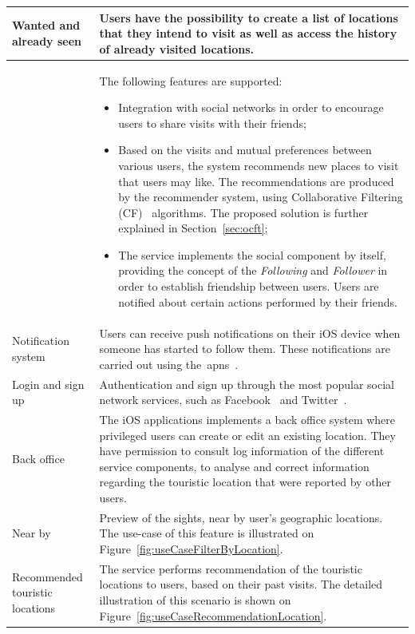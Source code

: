 \begin{center}
\begin{longtable}{ | p{3.5cm} | p{11.1cm} |}
    \specialcell[t]{Wanted and\\already seen} &
	Users have the possibility to create a list of locations that they intend to visit as well as access the history of already visited locations. \\ 
    \hline

	\specialcell[t]{Social component} &
    	The following features are supported:
	\begin{itemize}
	\item Integration with social networks in order to encourage users to share visits with their friends;
	\item Based on the visits and mutual preferences between various users, the system recommends new places to visit that users may like. The recommendations are produced by the recommender system, using Collaborative Filtering (CF)~\cite{ibCollabrativeVSGK}\cite{AmazonRecommendGLBSJY}\cite{recommSystemPMVS} algorithms. The proposed solution is further explained in Section~\ref{sec:ocft};
	\item The service implements the social component by itself, providing the concept of the \emph{Following} and \emph{Follower} in order to establish friendship between users. Users are notified about certain actions performed by their friends.
	\end{itemize}
    \\ 
    \hline
    
    Notification system &
    Users can receive push notifications on their iOS device when someone has started to follow them. These notifications are carried out using the~\gls{apns}~\cite{apns}.\\
\hline
    
   	Login and sign up &
    Authentication and sign up through the most popular social network services, such as Facebook~\cite{FacebookLogin} and Twitter~\cite{TwitterLogin}. \\
    \hline
    
   	Back office &
    The iOS applications implements a back office system where privileged users can create or edit an existing location. They have permission to consult log information of the different service components, to analyse and correct information regarding the touristic location that were reported by other users.\\
\hline

   	Near by  &
    Preview of the sights, near by user's geographic locations. The use-case of this feature is illustrated on Figure~\ref{fig:useCaseFilterByLocation}.\\
\hline

   	Recommended touristic locations  &
	The service performs recommendation of the touristic locations to users, based on their past visits. The detailed illustration of this scenario is shown on Figure~\ref{fig:useCaseRecommendationLocation}.\\
\hline
    \end{longtable}
\end{center}

